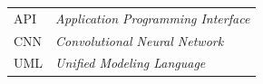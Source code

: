 \noindent
\begin{longtable}{@{}p{30mm}p{}@{}}
API  & \textit{Application Programming Interface}\\
CNN  & \textit{Convolutional Neural Network}\\
UML  & \textit{Unified Modeling Language}\\
\end{longtable}
